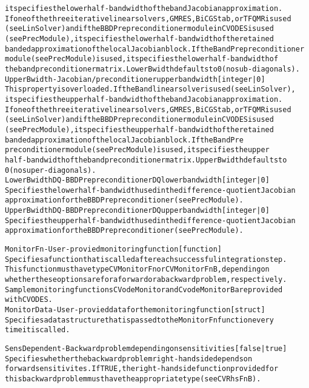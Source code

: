 \begin{alltt}
   it specifies the lower half-bandwidth of the band Jacobian approximation.
   If one of the three iterative linear solvers, GMRES, BiCGStab, or TFQMR is used
   (see LinSolver) and if the BBDPre preconditioner module in CVODES is used
   (see PrecModule), it specifies the lower half-bandwidth of the retained
   banded approximation of the local Jacobian block. If the BandPre preconditioner
   module (see PrecModule) is used, it specifies the lower half-bandwidth of
   the band preconditioner matrix. LowerBwidth defaults to 0 (no sub-diagonals).
UpperBwidth - Jacobian/preconditioner upper bandwidth [ integer | {0} ]
   This property is overloaded. If the Band linear solver is used (see LinSolver),
   it specifies the upper half-bandwidth of the band Jacobian approximation.
   If one of the three iterative linear solvers, GMRES, BiCGStab, or TFQMR is used
   (see LinSolver) and if the BBDPre preconditioner module in CVODES is used
   (see PrecModule), it specifies the upper half-bandwidth of the retained
   banded approximation of the local Jacobian block. If the BandPre
   preconditioner module (see PrecModule) is used, it specifies the upper
   half-bandwidth of the band preconditioner matrix. UpperBwidth defaults to
   0 (no super-diagonals).
LowerBwidthDQ - BBDPre preconditioner DQ lower bandwidth [ integer | {0} ]
   Specifies the lower half-bandwidth used in the difference-quotient Jacobian
   approximation for the BBDPre preconditioner (see PrecModule).
UpperBwidthDQ - BBDPre preconditioner DQ upper bandwidth [ integer | {0} ]
   Specifies the upper half-bandwidth used in the difference-quotient Jacobian
   approximation for the BBDPre preconditioner (see PrecModule).

MonitorFn - User-provied monitoring function [ function ]
   Specifies a function that is called after each successful integration step.
   This function must have type CVMonitorFn or CVMonitorFnB, depending on
   whether these options are for a forward or a backward problem, respectively.
   Sample monitoring functions CVodeMonitor and CvodeMonitorB are provided
   with CVODES.
MonitorData - User-provied data for the monitoring function [ struct ]
   Specifies a data structure that is passed to the MonitorFn function every
   time it is called.

SensDependent - Backward problem depending on sensitivities [ {false} | true ]
   Specifies whether the backward problem right-hand side depends on
   forward sensitivites. If TRUE, the right-hand side function provided for
   this backward problem must have the appropriate type (see CVRhsFnB).



\end{alltt}
